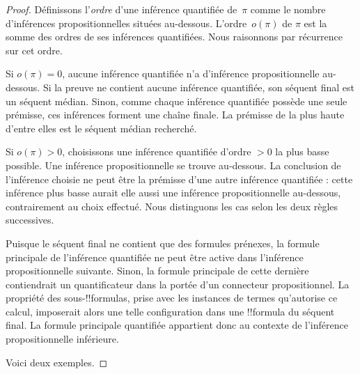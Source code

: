 \documentclass[../../../include/open-logic-section]{subfiles}
\begin{document}
\begin{proof}
Définissons l'\emph{ordre} d'une inférence quantifiée de~$\pi$
comme le nombre d'inférences propositionnelles situées au-dessous.
L'ordre~$o(\pi)$ de $\pi$ est la somme des ordres de ses inférences
quantifiées. Nous raisonnons par récurrence sur cet ordre.

Si $o(\pi) = 0$, aucune inférence quantifiée n'a d'inférence
propositionnelle au-dessous. Si la preuve ne contient aucune
inférence quantifiée, son séquent final est un séquent médian.
Sinon, comme chaque inférence quantifiée possède une seule
prémisse, ces inférences forment une chaîne finale. La prémisse
de la plus haute d'entre elles est le séquent médian recherché.

Si $o(\pi) > 0$, choisissons une inférence quantifiée d'ordre $>0$
la plus basse possible. Une inférence propositionnelle se trouve
au-dessous. La conclusion de l'inférence choisie ne peut être
la prémisse d'une autre inférence quantifiée : cette inférence
plus basse aurait elle aussi une inférence propositionnelle
au-dessous, contrairement au choix effectué.
Nous distinguons les cas selon les deux règles successives.

Puisque le séquent final ne contient que des formules prénexes,
la formule principale de l'inférence quantifiée ne peut être
active dans l'inférence propositionnelle suivante. Sinon,
la formule principale de cette dernière contiendrait un
quantificateur dans la portée d'un connecteur propositionnel.
La propriété des sous-!!{formula}s, prise avec les instances
de termes qu'autorise ce calcul, imposerait alors une telle
configuration dans une !!{formula} du séquent final.
La formule principale quantifiée appartient donc au contexte
de l'inférence propositionnelle inférieure.

Voici deux exemples.


\end{proof}
\end{document}
